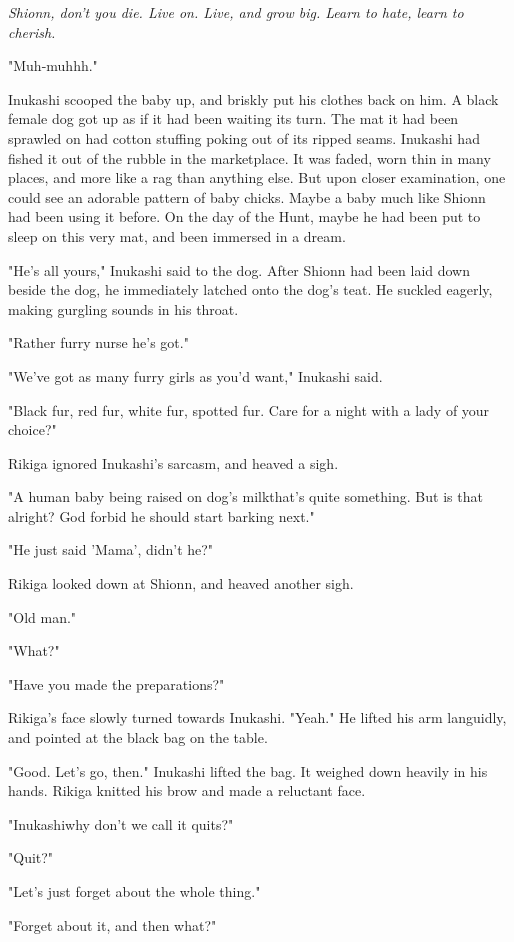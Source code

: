 \emph{Shionn, don't you die. Live on. Live, and grow big. Learn to hate, learn
to cherish.}

"Muh-muhhh."

Inukashi scooped the baby up, and briskly put his clothes back on him. A
black female dog got up as if it had been waiting its turn. The mat it
had been sprawled on had cotton stuffing poking out of its ripped seams.
Inukashi had fished it out of the rubble in the marketplace. It was
faded, worn thin in many places, and more like a rag than anything else.
But upon closer examination, one could see an adorable pattern of baby
chicks. Maybe a baby much like Shionn had been using it before. On the
day of the Hunt, maybe he had been put to sleep on this very mat, and
been immersed in a dream.

"He's all yours," Inukashi said to the dog. After Shionn had been laid
down beside the dog, he immediately latched onto the dog's teat. He
suckled eagerly, making gurgling sounds in his throat.

"Rather furry nurse he's got."

"We've got as many furry girls as you'd want," Inukashi said.

"Black fur, red fur, white fur, spotted fur. Care for a night with a
lady of your choice?"

Rikiga ignored Inukashi's sarcasm, and heaved a sigh.

"A human baby being raised on dog's milk\el that's quite something. But
is that alright? God forbid he should start barking next."

"He just said 'Mama', didn't he?"

Rikiga looked down at Shionn, and heaved another sigh.

"Old man."

"What?"

"Have you made the preparations?"

Rikiga's face slowly turned towards Inukashi. "Yeah." He lifted his arm
languidly, and pointed at the black bag on the table.

"Good. Let's go, then." Inukashi lifted the bag. It weighed down heavily
in his hands. Rikiga knitted his brow and made a reluctant face.

"Inukashi\el why don't we call it quits?"

"Quit?"

"Let's just forget about the whole thing."

"Forget about it, and then what?"

